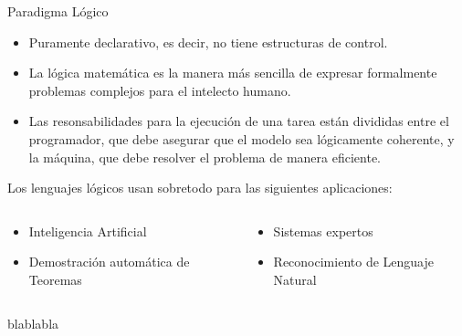 \documentclass[xcolor=dvipsnames]{beamer}
\begin{document}
\begin{frame}{Paradigma Lógico}

\begin{itemize}
\item Puramente declarativo, es decir, no tiene estructuras de control.
\item La lógica matemática es la manera más sencilla de expresar formalmente problemas complejos para el intelecto humano.
\item Las resonsabilidades para la ejecución de una tarea están divididas entre el programador, que debe asegurar que el modelo sea lógicamente coherente, y la máquina, que debe resolver el problema de manera eficiente.
\end{itemize}

Los lenguajes lógicos usan sobretodo para las siguientes aplicaciones:

\begin{columns}
  \begin{column}{0.45\textwidth}
  \begin{itemize}
    \item Inteligencia Artificial
    \item Demostración automática de Teoremas
  \end{itemize}
  \end{column}

  \begin{column}{0.45\textwidth}
  \begin{itemize}
    \item Sistemas expertos
    \item Reconocimiento de Lenguaje Natural
  \end{itemize}
  \end{column}
\end{columns}

\end{frame}

\begin{frame}

blablabla
\end{frame}
\end{document}
